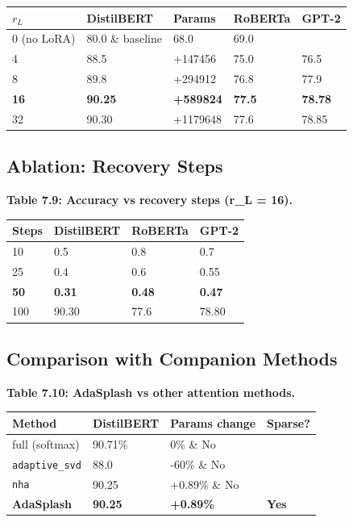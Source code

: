 \begin{table}[H]
\centering
\small
\begin{tabular}{lllll}
\toprule
\textbf{$r_L$} & \textbf{DistilBERT} & \textbf{Params} & \textbf{RoBERTa} & \textbf{GPT-2} \\
\midrule
0 (no LoRA) & 80.0 \& baseline & 68.0 & 69.0 \\
4 & 88.5 & +147456 & 75.0 & 76.5 \\
8 & 89.8 & +294912 & 76.8 & 77.9 \\
\textbf{16} & \textbf{90.25} & \textbf{+589824} & \textbf{77.5} & \textbf{78.78} \\
32 & 90.30 & +1179648 & 77.6 & 78.85 \\
\bottomrule
\end{tabular}
\end{table}

\subsection{Ablation: Recovery Steps}

\textbf{Table 7.9: Accuracy vs recovery steps (r\_L = 16).}

\begin{table}[H]
\centering
\small
\begin{tabular}{llll}
\toprule
\textbf{Steps} & \textbf{DistilBERT} & \textbf{RoBERTa} & \textbf{GPT-2} \\
\midrule
10 & 0.5 & 0.8 & 0.7 \\
25 & 0.4 & 0.6 & 0.55 \\
\textbf{50} & \textbf{0.31} & \textbf{0.48} & \textbf{0.47} \\
100 & 90.30 & 77.6 & 78.80 \\
\bottomrule
\end{tabular}
\end{table}

\subsection{Comparison with Companion Methods}

\textbf{Table 7.10: AdaSplash vs other attention methods.}

\begin{table}[H]
\centering
\small
\begin{tabular}{llll}
\toprule
\textbf{Method} & \textbf{DistilBERT} & \textbf{Params change} & \textbf{Sparse?} \\
\midrule
full (softmax) & 90.71\% & 0\% \& No \\
\texttt{adaptive\_svd} & 88.0 & -60\% \& No \\
\texttt{nha} & 90.25 & +0.89\% \& No \\
\textbf{AdaSplash} & \textbf{90.25} & \textbf{+0.89\%} & \textbf{Yes} \\
\bottomrule
\end{tabular}
\end{table}


